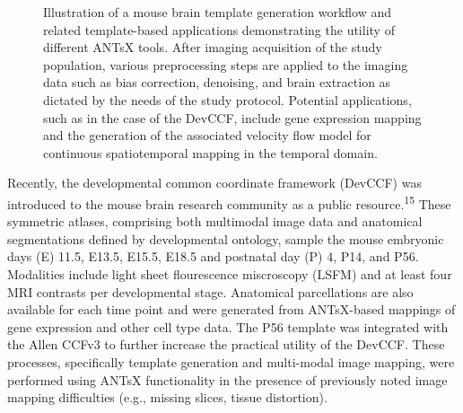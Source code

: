 \documentclass[
  12pt,
]{article}
\begin{document}
\begin{figure}[!htb]
\centering
{}%
\caption{Illustration of a mouse brain template generation workflow and related
template-based applications demonstrating the utility of different ANTsX tools.
After imaging acquisition of the study population, various preprocessing steps
are applied to the imaging data such as bias correction, denoising, and brain
extraction as dictated by the needs of the study protocol.  
Potential applications, such as in the case of the DevCCF, include gene
expression mapping and the generation of the associated velocity flow model for
continuous spatiotemporal mapping in the temporal domain.}
\label{fig:pipeline}
\end{figure}

Recently, the developmental common coordinate framework (DevCCF) was
introduced to the mouse brain research community as a public
resource.\textsuperscript{15} These symmetric atlases, comprising both
multimodal image data and anatomical segmentations defined by
developmental ontology, sample the mouse embryonic days (E) 11.5, E13.5,
E15.5, E18.5 and postnatal day (P) 4, P14, and P56. Modalities include
light sheet flourescence miscroscopy (LSFM) and at least four MRI
contrasts per developmental stage. Anatomical parcellations are also
available for each time point and were generated from ANTsX-based
mappings of gene expression and other cell type data. The P56 template
was integrated with the Allen CCFv3 to further increase the practical
utility of the DevCCF. These processes, specifically template generation
and multi-modal image mapping, were performed using ANTsX functionality
in the presence of previously noted image mapping difficulties (e.g.,
missing slices, tissue distortion).
\end{document}
